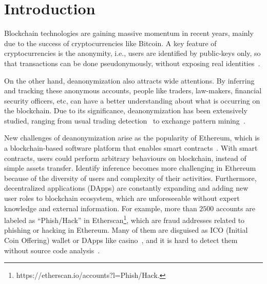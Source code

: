 \section{Introduction}
Blockchain technologies are gaining massive momentum in recent years, mainly due to the success of cryptocurrencies like Bitcoin. A key feature of cryptocurrencies is the anonymity, i.e., users are identified by public-keys only, so that transactions can be done pseudonymously, without exposing real identities~\cite{reid2013analysis}.

On the other hand, deanonymization also attracts wide attentions. By inferring and tracking these anonymous accounts, people like traders, law-makers, financial security officers, etc, can have a better understanding about what is occurring on the blockchain. Due to its significance, deanonymization has been extensively studied, ranging from usual trading detection~\cite{maesa2016analysis} to exchange pattern mining~\cite{ranshous2017exchange}.
 

New challenges of deanonymization arise as the popularity of Ethereum, which is a blockchain-based software platform that enables smart contracts~\cite{buterin2013ethereum}.
With smart contracts, users could perform arbitrary behaviours on blockchain, instead of simple assets transfer. 
Identify inference becomes more challenging in Ethereum because of the diversity of users and complexity of their activities. Furthermore, decentralized applications (DApps) are constantly expanding and adding new user roles to blockchain ecosystem, which are unforeseeable without expert knowledge and external information.
For example, more than $2500$ accounts are labeled as ``Phish/Hack'' in Etherscan\footnote{https://etherscan.io/accounts?l=Phish/Hack.}, which are fraud addresses related to phishing or hacking in Ethereum. Many of them are disguised as ICO (Initial Coin Offering) wallet or DApps like casino~\cite{cerchiello2018icos}, and it is hard to detect them without source code analysis~\cite{jiang2018contractfuzzer}. 


